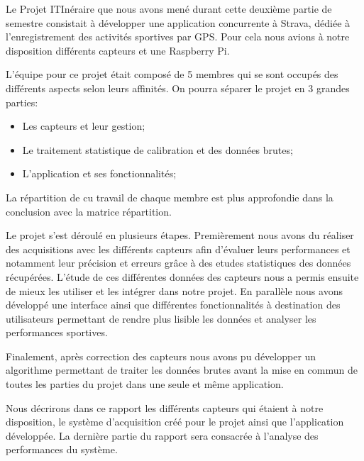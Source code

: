 Le Projet ITInéraire que nous avons mené durant cette deuxième partie de semestre consistait à développer une application concurrente à Strava, dédiée à l'enregistrement des activités sportives par GPS.\@
Pour cela nous avions à notre disposition différents capteurs et une Raspberry Pi.


L'équipe pour ce projet était composé de 5 membres qui se sont occupés des différents aspects selon leurs affinités. On pourra séparer le projet en 3 grandes parties:
\begin{itemize}
\item Les capteurs et leur gestion;
\item Le traitement statistique de calibration et des données brutes;
\item L'application et ses fonctionnalités;
\end{itemize}
La répartition de cu travail de chaque membre est plus approfondie dans la conclusion avec la matrice répartition.


Le projet s'est déroulé en plusieurs étapes. Premièrement nous avons du réaliser des acquisitions avec les différents capteurs afin d'évaluer leurs performances et notamment leur précision et erreurs grâce à des etudes statistiques des données récupérées. L'étude de ces différentes données des capteurs nous a permis ensuite de mieux les utiliser et les intégrer dans notre projet. En parallèle nous avons développé une interface ainsi que différentes fonctionnalités à destination des utilisateurs permettant de rendre plus lisible les données et analyser les performances sportives.


Finalement, après correction des capteurs nous avons pu développer un algorithme permettant de traiter les données brutes avant la mise en commun de toutes les parties du projet dans une seule et même application.


Nous décrirons dans ce rapport les différents capteurs qui étaient à notre disposition, le système d'acquisition créé pour le projet ainsi que l'application développée. La dernière partie du rapport sera consacrée à l'analyse des performances du système.
